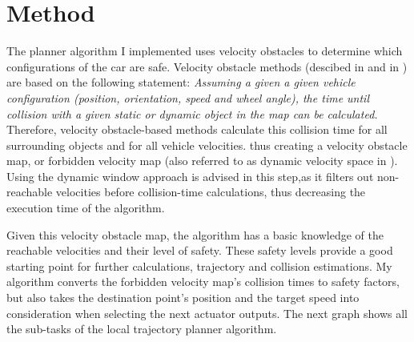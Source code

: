 \section{Method}

The planner algorithm I implemented uses velocity obstacles to determine which configurations of the car are safe. Velocity obstacle methods (descibed in \cite{VelocityForbiddenMap} and in \citep{VelocityObstacles}) are based on the following statement: \textit{Assuming a given a given vehicle configuration (position, orientation, speed and wheel angle), the time until collision with a given static or dynamic object in the map can be calculated.} Therefore, velocity obstacle-based methods calculate this collision time for all surrounding objects and for all vehicle velocities. thus creating a velocity obstacle map, or forbidden velocity map (also referred to as dynamic velocity space in \cite{DynamicMotionPlanningSurvey}). Using the dynamic window approach is advised in this step,as it filters out non-reachable velocities before collision-time calculations, thus decreasing the execution time of the algorithm.

Given this velocity obstacle map, the algorithm has a basic knowledge of the reachable velocities and their level of safety. These safety levels provide a good starting point for further calculations, trajectory and collision estimations. My algorithm converts the forbidden velocity map's collision times to safety factors, but also takes the destination point's position and the target speed into consideration when selecting the next actuator outputs. The next graph shows all the sub-tasks of the local trajectory planner algorithm.


